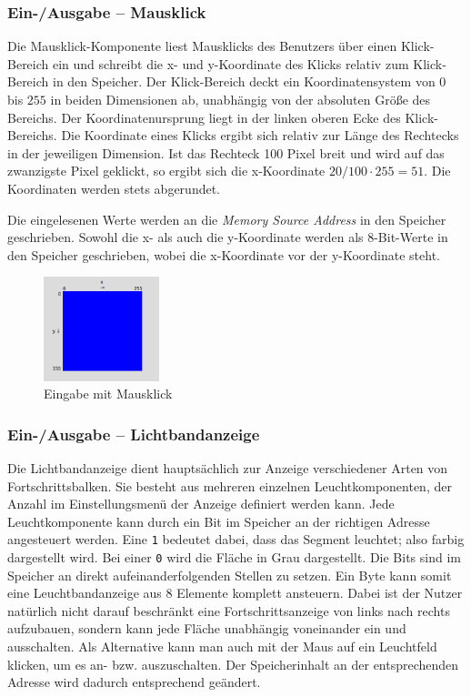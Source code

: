 \subsubsection{Ein-/Ausgabe -- Mausklick}
Die Mausklick-Komponente liest Mausklicks des Benutzers über einen
Klick-Bereich ein und schreibt die x- und y-Koordinate des Klicks relativ zum
Klick-Bereich in den Speicher. Der Klick-Bereich deckt ein Koordinatensystem von
$0$ bis $255$ in beiden Dimensionen ab, unabhängig von der absoluten Größe des
Bereichs. Der Koordinatenursprung liegt in der linken oberen Ecke des
Klick-Bereichs. Die Koordinate eines Klicks ergibt sich relativ zur Länge des
Rechtecks in der jeweiligen Dimension. Ist das Rechteck 100 Pixel breit und wird
auf das zwanzigste Pixel geklickt, so ergibt sich die x-Koordinate $20 / 100
\cdot 255 = 51$. Die Koordinaten werden stets abgerundet.

Die eingelesenen Werte werden an die \textit{Memory Source Address} in
den Speicher geschrieben. Sowohl die x- als auch die y-Koordinate werden als
8-Bit-Werte in den Speicher geschrieben, wobei die x-Koordinate vor der
y-Koordinate steht.

\begin{figure}[ht]
	\centering
	\includegraphics[width=0.3\textwidth]{Images/MouseArea}
	\caption{Eingabe mit Mausklick}
	\label{MouseArea}
\end{figure}

\subsubsection{Ein-/Ausgabe -- Lichtbandanzeige}

Die Lichtbandanzeige dient hauptsächlich zur Anzeige verschiedener Arten von
Fortschrittsbalken. Sie besteht aus mehreren einzelnen Leuchtkomponenten, der
Anzahl im Einstellungsmenü der Anzeige definiert werden kann. Jede
Leuchtkomponente kann durch ein Bit im Speicher an der richtigen Adresse
angesteuert werden. Eine \texttt{1} bedeutet dabei, dass das Segment leuchtet;
also farbig dargestellt wird. Bei einer \texttt{0} wird die Fläche in Grau
dargestellt. Die Bits sind im Speicher an direkt aufeinanderfolgenden Stellen zu
setzen. Ein Byte kann somit eine Leuchtbandanzeige aus 8 Elemente komplett
ansteuern. Dabei ist der Nutzer natürlich nicht darauf beschränkt eine
Fortschrittsanzeige von links nach rechts aufzubauen, sondern kann jede Fläche
unabhängig voneinander ein und ausschalten. Als Alternative kann man auch mit
der Maus auf ein Leuchtfeld klicken, um es an- bzw. auszuschalten. Der
Speicherinhalt an der entsprechenden Adresse wird dadurch entsprechend
geändert.\\


